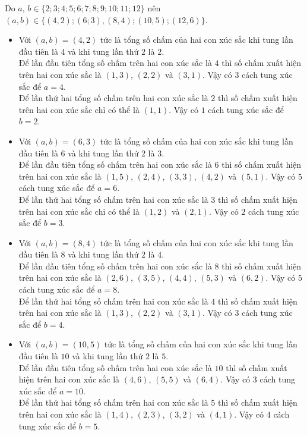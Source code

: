 \begin{ex}
{\begin{enumerate}[TH1:]
\begin{equation*}
			\end{equation*}
			Do $a$, $b \in \{2;3;4;5;6;7;8;9;10;11;12\}$ nên $(a,b) \in \{(4,2);(6;3),(8,4);(10,5);(12,6)\}$.
			\begin{itemize}
				\item Với $(a,b)=(4,2)$ tức là tổng số chấm của hai con xúc sắc khi tung lần đầu tiên là $4$ và khi tung lần thứ $2$ là $2$.\\ Để lần đầu tiên tổng số chấm trên hai con xúc sắc là $4$ thì số chấm xuất hiện trên hai con xúc sắc là $(1,3)$, $(2,2)$ và $ (3,1)$. Vậy có $3$ cách tung xúc sắc để $a=4$. \\Để lần thứ hai tổng số chấm trên hai con xúc sắc là $2$ thì số chấm xuất hiện trên hai con xúc sắc chỉ có thể là $(1,1)$. Vậy có $1$ cách tung xúc sắc để $b=2$.
				\item Với $(a,b)=(6,3)$ tức là tổng số chấm của hai con xúc sắc khi tung lần đầu tiên là $6$ và khi tung lần thứ $2$ là $3$.\\ Để lần đầu tiên tổng số chấm trên hai con xúc sắc là $6$ thì số chấm xuất hiện trên hai con xúc sắc là $(1,5)$, $(2,4)$, $(3,3)$, $(4,2)$ và $(5,1)$. Vậy có $5$ cách tung xúc sắc để $a=6$. \\Để lần thứ hai tổng số chấm trên hai con xúc sắc là $3$ thì số chấm xuất hiện trên hai con xúc sắc chỉ có thể là $(1,2)$ và $(2,1)$. Vậy có $2$ cách tung xúc sắc để $b=3$.
				\item Với $(a,b)=(8,4)$ tức là tổng số chấm của hai con xúc sắc khi tung lần đầu tiên là $8$ và khi tung lần thứ $2$ là $4$.\\ Để lần đầu tiên tổng số chấm trên hai con xúc sắc là $8$ thì số chấm xuất hiện trên hai con xúc sắc là $(2,6)$, $(3,5)$, $(4,4)$, $(5,3)$ và $(6,2)$. Vậy có $5$ cách tung xúc sắc để $a=8$. \\Để lần thứ hai tổng số chấm trên hai con xúc sắc là $4$ thì số chấm xuất hiện trên hai con xúc sắc là $(1,3)$, $(2,2)$ và $ (3,1)$. Vậy có $3$ cách tung xúc sắc để $b=4$.
				\item Với $(a,b)=(10,5)$ tức là tổng số chấm của hai con xúc sắc khi tung lần đầu tiên là $10$ và khi tung lần thứ $2$ là $5$.\\ Để lần đầu tiên tổng số chấm trên hai con xúc sắc là $10$ thì số chấm xuất hiện trên hai con xúc sắc là $(4,6)$, $(5,5)$ và $(6,4)$. Vậy có $3$ cách tung xúc sắc để $a=10$. \\Để lần thứ hai tổng số chấm trên hai con xúc sắc là $5$ thì số chấm xuất hiện trên hai con xúc sắc là $(1,4)$, $(2,3)$, $(3,2)$ và $(4,1)$. Vậy có $4$ cách tung xúc sắc để $b=5$.

\end{itemize}
\end{enumerate}}
\end{ex}

